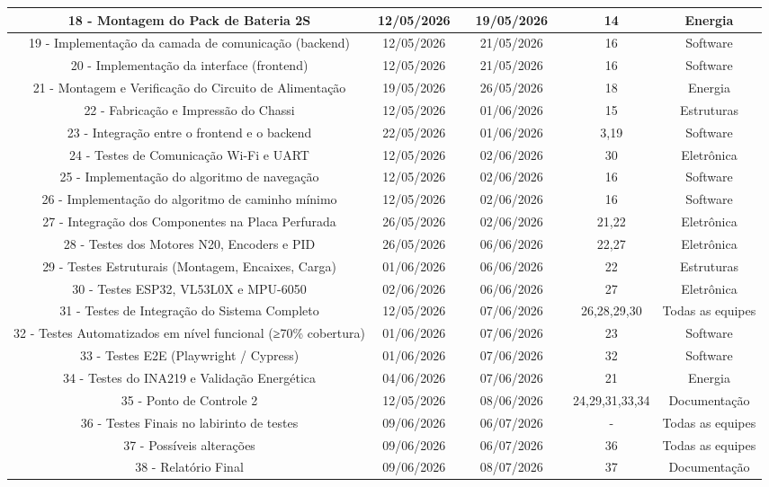 \begin{landscape}
\begin{table}[htpb]
{\begin{tabular}{|c|c|c|c|c|c|c|}
18 - Montagem do Pack de Bateria 2S & 12/05/2026 &  & 19/05/2026 &  & 14 & Energia \\ \hline
19 - Implementação da camada de comunicação (backend) & 12/05/2026 &  & 21/05/2026 &  & 16 & Software \\ \hline
20 - Implementação da interface (frontend) & 12/05/2026 &  & 21/05/2026 &  & 16 & Software \\ \hline
21 - Montagem e Verificação do Circuito de Alimentação & 19/05/2026 &  & 26/05/2026 &  & 18 & Energia \\ \hline
22 - Fabricação e Impressão do Chassi & 12/05/2026 &  & 01/06/2026 &  & 15 & Estruturas \\ \hline
23 - Integração entre o frontend e o backend & 22/05/2026 &  & 01/06/2026 &  & 3,19 & Software \\ \hline
24 - Testes de Comunicação Wi-Fi e UART & 12/05/2026 &  & 02/06/2026 &  & 30 & Eletrônica \\ \hline
25 - Implementação do algoritmo de navegação & 12/05/2026 &  & 02/06/2026 &  & 16 & Software \\ \hline
26 - Implementação do algoritmo de caminho mínimo & 12/05/2026 &  & 02/06/2026 &  & 16 & Software \\ \hline
27 - Integração dos Componentes na Placa Perfurada & 26/05/2026 &  & 02/06/2026 &  & 21,22 & Eletrônica \\ \hline
28 - Testes dos Motores N20, Encoders e PID & 26/05/2026 &  & 06/06/2026 &  & 22,27 & Eletrônica \\ \hline

29 - Testes Estruturais (Montagem, Encaixes, Carga) & 01/06/2026 &  & 06/06/2026 &  & 22 & Estruturas \\ \hline
30 - Testes ESP32, VL53L0X e MPU-6050 & 02/06/2026 &  & 06/06/2026 &  & 27 & Eletrônica \\ \hline
31 - Testes de Integração do Sistema Completo & 12/05/2026 &  & 07/06/2026 &  & 26,28,29,30 & Todas as equipes \\ \hline
32 - Testes Automatizados em nível funcional (≥70\% cobertura) & 01/06/2026 &  & 07/06/2026 &  & 23 & Software \\ \hline
33 - Testes E2E (Playwright / Cypress) & 01/06/2026 &  & 07/06/2026 &  & 32 & Software \\ \hline
34 - Testes do INA219 e Validação Energética & 04/06/2026 &  & 07/06/2026 &  & 21 & Energia \\ \hline
35 - Ponto de Controle 2 & 12/05/2026 &  & 08/06/2026 &  & 24,29,31,33,34 & Documentação \\ \hline
36 - Testes Finais no labirinto de testes & 09/06/2026 &  & 06/07/2026 &  & - & Todas as equipes \\ \hline
37 - Possíveis alterações & 09/06/2026 &  & 06/07/2026 &  & 36 & Todas as equipes \\ \hline
38 - Relatório Final & 09/06/2026 &  & 08/07/2026 &  & 37 & Documentação \\ \hline


\end{tabular}}
\end{table}
\end{landscape}
